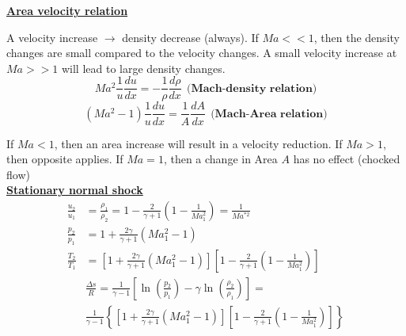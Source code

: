 \documentclass[8pt, landscape, fleqn]{scrartcl}
\begin{document}
\begin{multicols*}{3}
\underline{\textbf{Area velocity relation}}

A velocity increase $\rightarrow$ density decrease (always). If $Ma << 1$, then the density changes are small compared to the velocity changes. A small velocity increase at $Ma >> 1$ will lead to large density changes.
\begin{equation*}
    Ma^2 \frac{1}{u} \frac{d u}{d x} = -\frac{1}{\rho} \frac{d \rho}{d x}~~\textbf{(Mach-density relation)}
\end{equation*}
\begin{equation*}
    \left( Ma^2 -1 \right) \frac{1}{u} \frac{d u}{d x} = \frac{1}{A} \frac{d A}{d x}~~\textbf{(Mach-Area relation)}
\end{equation*}

If $Ma < 1$, then an area increase will result in a velocity reduction. If $Ma > 1$, then opposite applies. If $Ma = 1$, then a change in Area $A$ has no effect (chocked flow) \\

\underline{\textbf{Stationary normal shock}}
\begin{align*}
    \frac{u_2}{u_1} &= \frac{\rho_1}{\rho_2} = 1 - \frac{2}{\gamma+1} \left( 1- \frac{1}{Ma_1^2}\right) = \frac{1}{Ma^{*2}} \\
    \frac{p_2}{p_1} &= 1 + \frac{2 \gamma}{\gamma + 1} \left( Ma_1^2 - 1 \right) \\
    \frac{T_2}{T_1} &= \left[ 1 + \frac{2 \gamma}{\gamma + 1} \left( Ma_1^2 -1 \right) \right]\left[ 1-\frac{2}{\gamma+1} \left( 1-\frac{1}{Ma_1^2} \right) \right] \\
    &\frac{\Delta s}{R} = \frac{1}{\gamma-1} \left[ \ln \left( \frac{p_2}{p_1} \right) - \gamma \ln \left( \frac{\rho_2}{\rho_1}\right)\right] = \\
    & \frac{1}{\gamma-1}\left\{\left[ 1 + \frac{2\gamma}{\gamma+1}\left( Ma_1^2 -1 \right)\right] \left[ 1-\frac{2}{\gamma+1}\left(1-\frac{1}{Ma_1^2}\right)\right]\right\}
\end{align*}


\end{multicols*}
\end{document}
